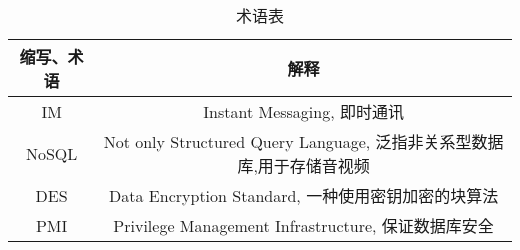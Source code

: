 \begin{table}[htbp]
\centering
\caption{术语表} \label{tab:terminology}
\begin{tabular}{|c|c|}
    \hline
    缩写、术语 & 解释 \\
     \hline
      IM & Instant Messaging, 即时通讯 \\
     \hline
      NoSQL & Not only Structured Query Language, 泛指非关系型数据库,用于存储音视频 \\
     \hline
     DES & Data Encryption Standard, 一种使用密钥加密的块算法 \\
     \hline
     PMI & Privilege Management Infrastructure, 保证数据库安全 \\
     \hline
 \end{tabular}
 \end{table}